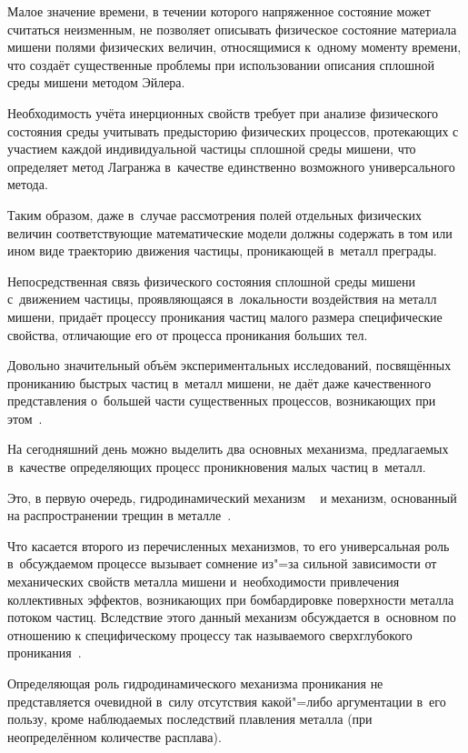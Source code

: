 Малое значение времени, в течении которого  напряженное состояние может считаться неизменным, не позволяет описывать физическое состояние материала мишени полями физических величин, относящимися к~одному моменту времени, что создаёт существенные проблемы при использовании описания сплошной среды мишени методом Эйлера. 

Необходимость учёта инерционных свойств требует при анализе физического состояния среды учитывать предысторию физических процессов, протекающих с участием каждой индивидуальной частицы сплошной среды мишени, что определяет метод Лагранжа в~качестве единственно возможного универсального метода. 

Таким образом, даже в~случае рассмотрения полей отдельных физических величин соответствующие математические модели должны содержать в том или ином виде траекторию движения частицы, проникающей в~металл преграды.



Непосредственная связь физического состояния сплошной среды мишени с~движением частицы, проявляющаяся в~локальности воздействия на металл мишени, придаёт процессу  проникания частиц малого размера специфические свойства, отличающие его от процесса проникания больших тел. 

Довольно значительный объём экспериментальных исследований, посвящённых прониканию быстрых частиц в~металл мишени, не даёт даже качественного представления о~большей части существенных процессов, возникающих при этом~\cite{bib:KV}. 

На сегодняшний день можно выделить два основных механизма, предлагаемых в~качестве определяющих процесс проникновения малых частиц в~металл. 

Это, в первую очередь, гидродинамический механизм ~\cite{bib:V,bib:PRL} и механизм, основанный на распространении трещин в металле~\cite{bib:EDK}. 

Что касается второго из перечисленных механизмов, то его универсальная роль в~обсуждаемом процессе вызывает сомнение из"=за сильной зависимости от механических свойств металла мишени и~необходимости привлечения коллективных эффектов, возникающих при бомбардировке поверхности металла потоком частиц. Вследствие этого данный механизм обсуждается в~основном по отношению к специфическому процессу так называемого сверхглубокого проникания~\cite{bib:KSV}.



Определяющая роль гидродинамического механизма проникания не представляется очевидной в~силу отсутствия какой"=либо аргументации в~его пользу, кроме наблюдаемых последствий плавления металла (при неопределённом количестве расплава). 

